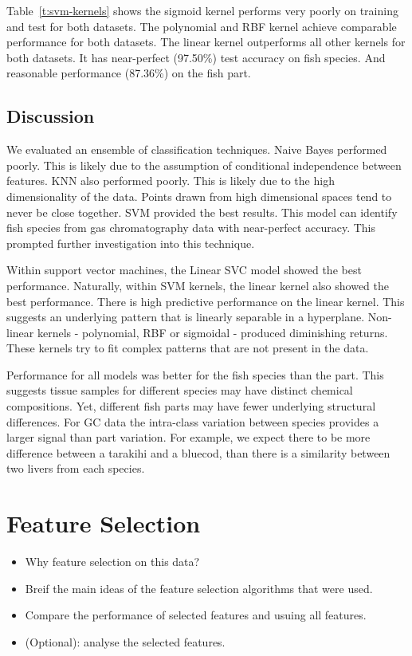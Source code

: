 \documentclass[runningheads]{llncs}
\begin{document}
Table~\ref{t:svm-kernels} shows the sigmoid kernel performs very poorly on training and test for both datasets.
The polynomial and RBF kernel achieve comparable performance for both datasets.
The linear kernel outperforms all other kernels for both datasets.
It has near-perfect (97.50\%) test accuracy on fish species.
And reasonable performance (87.36\%) on the fish part.

\subsection{Discussion}
\label{sec:results-classification-discussion}

We evaluated an ensemble of classification techniques.
Naive Bayes performed poorly.
This is likely due to the assumption of conditional independence between features.
KNN also performed poorly. This is likely due to the high dimensionality of the data.
Points drawn from high dimensional spaces tend to never be close together.
SVM provided the best results.
This model can identify fish species from gas chromatography data with near-perfect accuracy.
This prompted further investigation into this technique.

Within support vector machines, the Linear SVC model showed the best performance.
Naturally, within SVM kernels, the linear kernel also showed the best performance.
There is high predictive performance on the linear kernel.
This suggests an underlying pattern that is linearly separable in a hyperplane.
Non-linear kernels - polynomial, RBF or sigmoidal - produced diminishing returns.
These kernels try to fit complex patterns that are not present in the data.

Performance for all models was better for the fish species than the part.
This suggests tissue samples for different species may have distinct chemical compositions.
Yet, different fish parts may have fewer underlying structural differences.
For GC data the intra-class variation between species provides a larger signal than part variation.
For example, we expect there to be more difference between a tarakihi and a bluecod, than there is a similarity between two livers from each species.

\section{Feature Selection}

\begin{itemize}
    \item Why feature selection on this data? 
    \item Breif the main ideas of the feature selection algorithms that were used. 
    \item Compare the performance of selected features and usuing all features. 
    \item (Optional): analyse the selected features. 
\end{itemize}
\end{document}
